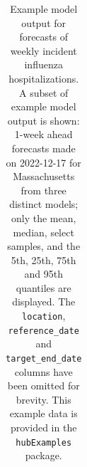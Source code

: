 \documentclass[
  letterpaper,
  DIV=11,
  numbers=noendperiod]{scrartcl}
\begin{document}
\begin{longtable}[]{@{}
  >{\raggedright\arraybackslash}p{}
  >{\raggedright\arraybackslash}p{}
  >{\raggedleft\arraybackslash}p{}
  >{\raggedright\arraybackslash}p{}
  >{\raggedright\arraybackslash}p{}
  >{\raggedleft\arraybackslash}p{}@{}}

\caption{\label{tbl-example-model-outputs}Example model output for
forecasts of weekly incident influenza hospitalizations. A subset of
example model output is shown: 1-week ahead forecasts made on 2022-12-17
for Massachusetts from three distinct models; only the mean, median,
select samples, and the 5th, 25th, 75th and 95th quantiles are
displayed. The \texttt{location}, \texttt{reference\_date} and
\texttt{target\_end\_date} columns have been omitted for brevity. This
example data is provided in the \texttt{hubExamples} package.}

\tabularnewline


\end{longtable}
\end{document}
